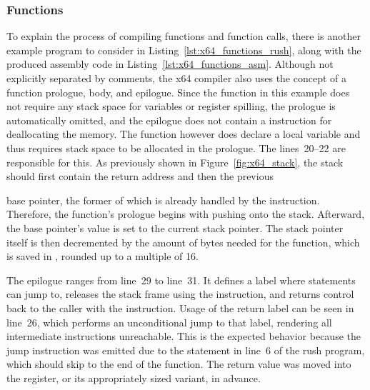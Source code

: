 \subsubsection{Functions}


To explain the process of compiling functions and function calls, there is another example program to consider in Listing~\ref{lst:x64_functions_rush}, along with the produced assembly code in Listing~\ref{lst:x64_functions_asm}.
Although not explicitly separated by comments, the x64 compiler also uses the concept of a function prologue, body, and epilogue.
Since the  function in this example does not require any stack space for variables or register spilling, the prologue is automatically omitted, and the epilogue does not contain a  instruction for deallocating the memory.
The  function however does declare a local variable and thus requires stack space to be allocated in the prologue.
The lines~20--22 are responsible for this.
As previously shown in Figure~\ref{fig:x64_stack}, the stack should first contain the return address and then the previous%
%
\setlength\parfillskip{0pt}\par\setlength{}%
\noindent%
%
base pointer, the former of which is already handled by the  instruction.
Therefore, the function's prologue begins with pushing  onto the stack.
Afterward, the base pointer's value is set to the current stack pointer.
The stack pointer itself is then decremented by the amount of bytes needed for the function, which is saved in , rounded up to a multiple of 16.

The epilogue ranges from line~29 to line~31.
It defines a label where  statements\label{x64_return} can jump to, releases the stack frame using the  instruction, and returns control back to the caller with the  instruction.
Usage of the return label can be seen in line~26, which performs an unconditional jump to that label, rendering all intermediate instructions unreachable.
This is the expected behavior because the jump instruction was emitted due to the  statement in line~6 of the rush program, which should skip to the end of the function.
The return value was moved into the  register, or its appropriately sized variant, in advance.

